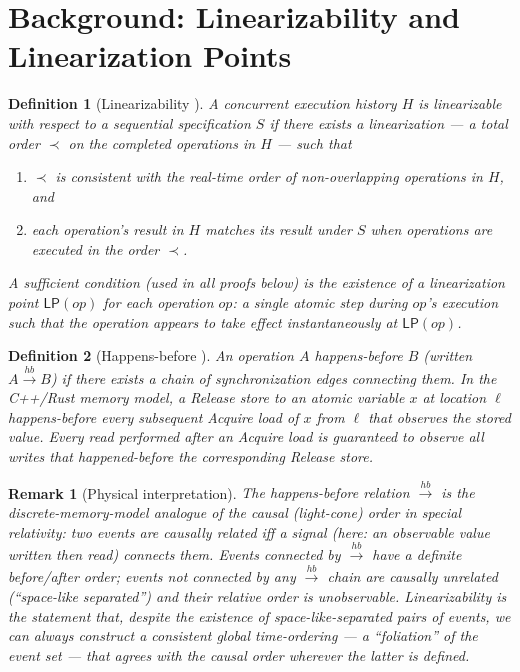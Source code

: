 \documentclass[11pt,a4paper]{report}
\newtheorem{definition}{Definition}[section]
\newtheorem{remark}{Remark}[section]
\newcommand{\LP}[1]{\mathsf{LP}(#1)}
\begin{document}
\section{Background: Linearizability and Linearization Points}

\begin{definition}[Linearizability \cite{herlihy_wing1990}]
A concurrent execution history $H$ is \emph{linearizable} with
respect to a sequential specification $S$ if there exists a
\emph{linearization} --- a total order $\prec$ on the completed
operations in $H$ --- such that
\begin{enumerate}
  \item $\prec$ is consistent with the real-time order of
        non-overlapping operations in $H$, and
  \item each operation's result in $H$ matches its result under $S$
        when operations are executed in the order $\prec$.
\end{enumerate}
A sufficient condition (used in all proofs below) is the existence
of a \emph{linearization point} $\LP{op}$ for each operation $op$:
a single atomic step \emph{during} $op$'s execution such that the
operation appears to take effect instantaneously at $\LP{op}$.
\end{definition}

\begin{definition}[Happens-before \cite{boehm2008}]
\label{def:hb}
An operation $A$ \emph{happens-before} $B$ (written
$A \xrightarrow{hb} B$) if there exists a chain of
synchronization edges connecting them.  In the C++/Rust memory
model, a \emph{Release store} to an atomic variable $x$ at location
$\ell$ happens-before every subsequent \emph{Acquire load} of $x$
from $\ell$ that observes the stored value.  Every read performed
after an Acquire load is guaranteed to observe all writes that
happened-before the corresponding Release store.
\end{definition}

\begin{remark}[Physical interpretation]
The happens-before relation $\xrightarrow{hb}$ is the
discrete-memory-model analogue of the \emph{causal (light-cone)
order} in special relativity: two events are causally related
iff a signal (here: an observable value written then read) connects
them.  Events connected by $\xrightarrow{hb}$ have a
definite before/after order; events \emph{not} connected by any
$\xrightarrow{hb}$ chain are causally unrelated (``space-like
separated'') and their relative order is unobservable.
Linearizability is the statement that, despite the existence of
space-like-separated pairs of events, we can always construct a
consistent global time-ordering --- a ``foliation'' of the event
set --- that agrees with the causal order wherever the latter is
defined.
\end{remark}
\end{document}
